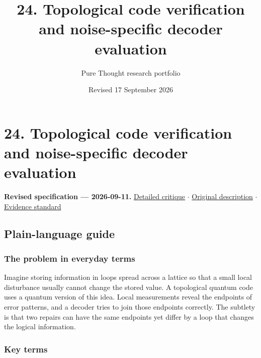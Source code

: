 \documentclass[
  11pt,
]{article}
\title{24. Topological code verification and noise-specific decoder
evaluation}
\author{Pure Thought research portfolio}
\date{Revised 17 September 2026}
\begin{document}
\maketitle
\thispagestyle{empty}
\clearpage

\section{24. Topological code verification and noise-specific decoder
evaluation}

\textbf{Revised specification --- 2026-09-11.}
\href{https://github.com/rick-stevens-ai/Pure-Thought/blob/main/reviews/24-Topological-Quantum-Error-Correction.md}{Detailed
critique} \ensuremath{\cdot}
\href{https://github.com/rick-stevens-ai/Pure-Thought/blob/main/archive/original-PRDs/24-Topological-Quantum-Error-Correction.md}{Original
description} \ensuremath{\cdot}
\href{https://github.com/rick-stevens-ai/Pure-Thought/blob/main/reviews/EVIDENCE-STANDARD.md}{Evidence
standard}

\subsection{Plain-language guide}

\subsubsection{The problem in everyday terms}

Imagine storing information in loops spread across a lattice so that a
small local disturbance usually cannot change the stored value. A
topological quantum code uses a quantum version of this idea. Local
measurements reveal the endpoints of error patterns, and a decoder tries
to join those endpoints correctly. The subtlety is that two repairs can
have the same endpoints yet differ by a loop that changes the logical
information.

\subsubsection{Key terms}
\end{document}
